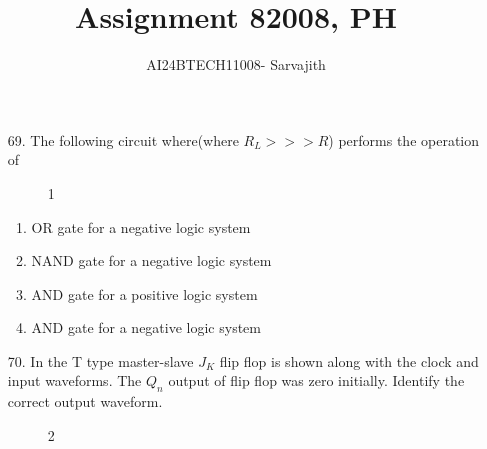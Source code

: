 \documentclass[journal]{IEEEtran}
\begin{document}

\vspace{3cm}


\author{AI24BTECH11008- Sarvajith
}
\title{Assignment 8}
{\let\newpage\relax\maketitle}
\title{2008, PH}
\renewcommand{\thefigure}{\theenumi}
\renewcommand{\thetable}{\theenumi}
\setlength{\intextsep}{10pt} %
\renewcommand{\thetable}{\theenumi}
\begin{enumerate}
    \item[69.] The following circuit where(where $R_L>>>R$) performs the operation of 
    \begin{figure}[!ht]
    \centering
    \caption{1}
    \label{fig1}
     \end{figure}
    \begin{enumerate} [label=(\Alph*)]
        \item OR gate for a negative logic system
        \item NAND gate for a negative logic system 
        \item AND gate for a positive logic system
        \item AND gate for a negative logic system
    \end{enumerate}
    \item[70.]  In the T type master-slave $J_K$ flip flop is shown along with the clock and input waveforms. The $Q_n$ output of flip flop was zero initially. Identify the correct output waveform.
     \begin{figure}[!ht]
      \centering
      \caption{ 2}
      \label{fig2}
     \end{figure}
    
     \begin{figure}[!ht]
      \centering
     \end{figure}
        \begin{figure}[!ht]
          \centering
            \end{figure}
            

\end{enumerate}
\end{document}
